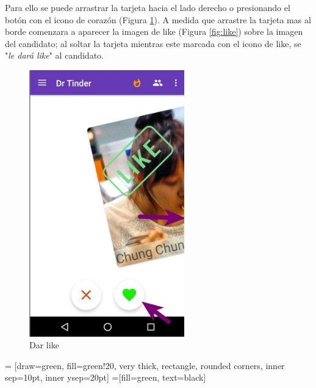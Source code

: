 \documentclass[10pt,letterpaper,extrafontsizes]{memoir}
\begin{document}
Para ello se puede arrastrar la tarjeta hacia el lado derecho o presionando el botón con el icono de corazón (Figura \ref{fig:dlike}). A medida que arrastre la tarjeta mas al borde comenzara a aparecer la imagen de like (Figura \ref{fig:like}) sobre la imagen del candidato; al soltar la tarjeta mientras este marcada con el icono de like, se "\emph{le dará like}" al candidato.

\begin{figure}[H]
    \centering
\includegraphics[width=0.6\textwidth]{graficos/capturas/m}
    \caption{Dar like}
    \label{fig:dlike}
\end{figure}

\begin{center}
 = [draw=green, fill=green!20, very thick,
    rectangle, rounded corners, inner sep=10pt, inner ysep=20pt]
 =[fill=green, text=black]
\end{center}
%
\end{document}
